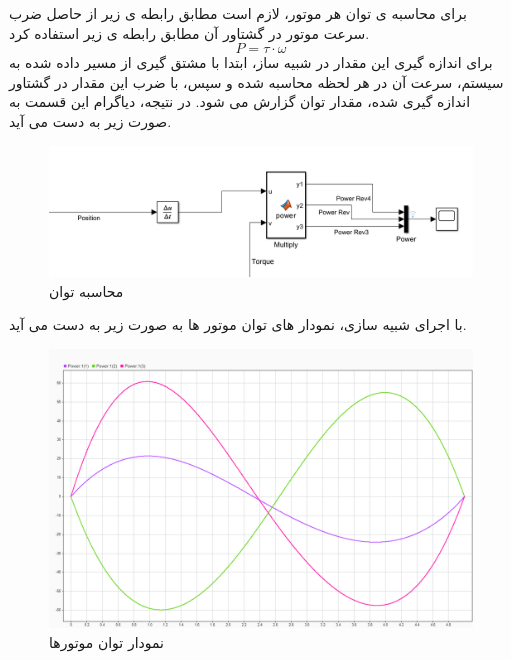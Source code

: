 برای محاسبه ی توان هر موتور، لازم است مطابق رابطه ی زیر از حاصل ضرب سرعت موتور در گشتاور آن مطابق رابطه ی زیر استفاده کرد. 
\[
P = \tau \cdot \omega
\]
برای اندازه گیری این مقدار در شبیه ساز، ابتدا با مشتق گیری از مسیر داده شده به سیستم، سرعت آن در هر لحظه محاسبه شده و سپس، با ضرب این مقدار در گشتاور اندازه گیری شده، مقدار توان گزارش می شود. 
در نتیجه، دیاگرام این قسمت به صورت زیر به دست می آید. 
\begin{figure}[H]
	\centering
	\includegraphics[width=0.7\linewidth]{../img/21}
	\caption{محاسبه توان}
	\label{fig:21}
\end{figure}
با اجرای شبیه سازی، نمودار های توان موتور ها به صورت زیر به دست می آید. 
\begin{figure}[H]
	\centering
	\includegraphics[width=1\linewidth]{../img/22}
	\caption{نمودار توان موتورها}
	\label{fig:22}
\end{figure}

